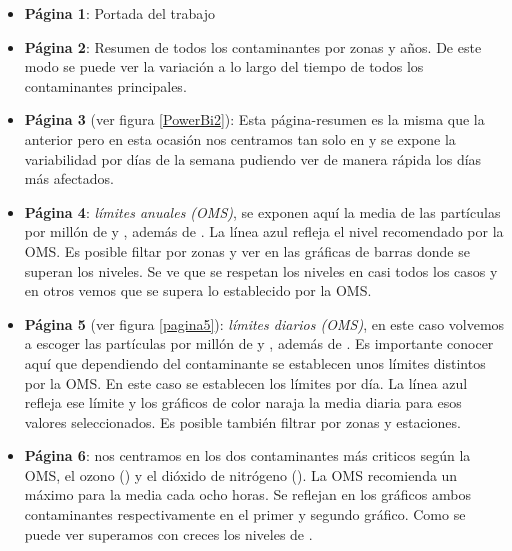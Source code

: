 \begin{itemize}
	\item \textbf{Página 1}: Portada del trabajo
	\item \textbf{Página 2}: Resumen de todos los contaminantes por zonas y años. De este modo se puede ver la variación a lo largo del tiempo de todos los contaminantes principales.
	\item \textbf{Página 3} (ver figura \ref{PowerBi2}): Esta página-resumen es la misma que la anterior pero en esta ocasión nos centramos tan solo en   y se expone la variabilidad por días de la semana pudiendo ver de manera rápida los días más afectados.

	\item \textbf{Página 4}: \textit{límites anuales (OMS)},	se exponen aquí la media de las partículas por millón de  y  , además de  .  La línea azul refleja el nivel recomendado por la OMS. Es posible filtar por zonas y ver en las gráficas de barras donde se superan los niveles. Se ve que se respetan los niveles en casi todos los casos y en otros vemos que se supera lo establecido por la OMS.
	
	\item \textbf{Página 5} (ver figura \ref{pagina5}):  \textit{límites diarios (OMS)}, en este caso volvemos a escoger las partículas por millón de  y  , además de . Es importante conocer aquí que dependiendo del contaminante se establecen unos límites distintos por la OMS. En este caso se establecen los límites por día. La línea azul refleja ese límite y los gráficos de color naraja la media diaria para esos valores seleccionados. Es posible también filtrar por zonas y estaciones. 
	
	
	\item \textbf{Página 6}: nos centramos en los dos contaminantes más criticos según la OMS, el ozono () y el dióxido de nitrógeno (). La OMS recomienda un máximo para la media cada ocho horas. Se reflejan en los gráficos ambos contaminantes respectivamente en el primer y segundo gráfico. Como se puede ver superamos con creces los niveles de .
	
	

\end{itemize}
